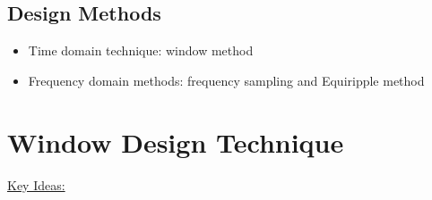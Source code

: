 \documentclass[12pt,a4paper]{book}
\begin{document}
\newpage
\subsection{Design Methods}

\begin{itemize}
    \item Time domain technique: window method
    
    
    \item Frequency domain methods: frequency sampling and Equiripple method
\end{itemize}


\section{Window Design Technique}

\underline{Key Ideas:}\\
\end{document}
